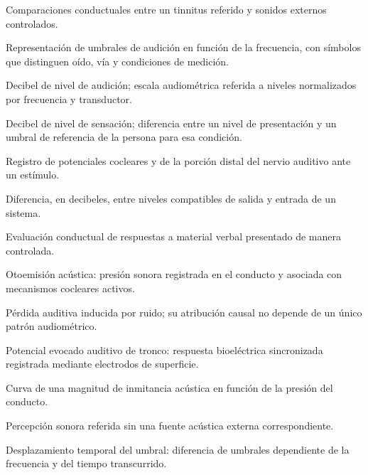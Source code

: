 \begin{description}[style=nextline]
    \item[Acufenometría.]
    Comparaciones conductuales entre un tinnitus referido y sonidos externos
    controlados.

    \item[Audiograma.]
    Representación de umbrales de audición en función de la frecuencia, con
    símbolos que distinguen oído, vía y condiciones de medición.

    \item[dB HL.]
    Decibel de nivel de audición; escala audiométrica referida a niveles
    normalizados por frecuencia y transductor.

    \item[dB SL.]
    Decibel de nivel de sensación; diferencia entre un nivel de presentación
    y un umbral de referencia de la persona para esa condición.

    \item[Electrococleografía.]
    Registro de potenciales cocleares y de la porción distal del nervio
    auditivo ante un estímulo.

    \item[Ganancia electroacústica.]
    Diferencia, en decibeles, entre niveles compatibles de salida y entrada de
    un sistema.

    \item[Logoaudiometría.]
    Evaluación conductual de respuestas a material verbal presentado de
    manera controlada.

    \item[OEA.]
    Otoemisión acústica: presión sonora registrada en el conducto y asociada
    con mecanismos cocleares activos.

    \item[PAIR o NIHL.]
    Pérdida auditiva inducida por ruido; su atribución causal no depende de un
    único patrón audiométrico.

    \item[PEAT.]
    Potencial evocado auditivo de tronco: respuesta bioeléctrica sincronizada
    registrada mediante electrodos de superficie.

    \item[Timpanograma.]
    Curva de una magnitud de inmitancia acústica en función de la presión del
    conducto.

    \item[Tinnitus o acúfeno.]
    Percepción sonora referida sin una fuente acústica externa
    correspondiente.

    \item[TTS.]
    Desplazamiento temporal del umbral: diferencia de umbrales dependiente de
    la frecuencia y del tiempo transcurrido.
\end{description}

